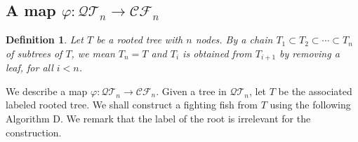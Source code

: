 \documentclass[a4paper,11pt,reqno]{amsart}
\newtheorem{defi}[lem]{Definition}
\theoremstyle{definition}
\numberwithin{equation}{section}
\newcommand{\CF}{{\mathcal{CF}}}
\newcommand{\QT}{{\mathcal{QT}}}
\begin{document}
\subsection{A map $\varphi:\QT_n\rightarrow\CF_n$}

\begin{defi} {\rm
Let $T$ be a rooted tree with $n$ nodes. By a \emph{chain} $T_1\subset T_2\subset\cdots\subset T_n$ \emph{of subtrees} of $T$, we mean $T_n=T$ and $T_i$ is obtained from $T_{i+1}$ by removing a leaf, for all $i<n$.
}
\end{defi}


We describe a map $\varphi:\QT_n\rightarrow\CF_n$. Given a tree in $\QT_n$, let $T$ be the associated labeled rooted tree. We shall construct a fighting fish from $T$ using the following Algorithm D. We remark that the label of the root is irrelevant for the construction.

 
\end{document}
